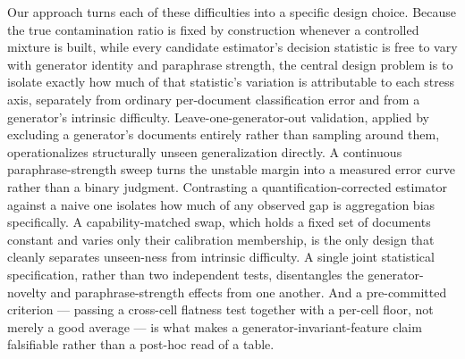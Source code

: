\documentclass[11pt]{article}
\begin{document}
Our approach turns each of these difficulties into a specific design choice. Because the true contamination ratio is fixed by construction whenever a controlled mixture is built, while every candidate estimator's decision statistic is free to vary with generator identity and paraphrase strength, the central design problem is to isolate exactly how much of that statistic's variation is attributable to each stress axis, separately from ordinary per-document classification error and from a generator's intrinsic difficulty. Leave-one-generator-out validation, applied by excluding a generator's documents entirely rather than sampling around them, operationalizes structurally unseen generalization directly. A continuous paraphrase-strength sweep turns the unstable margin into a measured error curve rather than a binary judgment. Contrasting a quantification-corrected estimator against a naive one isolates how much of any observed gap is aggregation bias specifically. A capability-matched swap, which holds a fixed set of documents constant and varies only their calibration membership, is the only design that cleanly separates unseen-ness from intrinsic difficulty. A single joint statistical specification, rather than two independent tests, disentangles the generator-novelty and paraphrase-strength effects from one another. And a pre-committed criterion --- passing a cross-cell flatness test together with a per-cell floor, not merely a good average --- is what makes a generator-invariant-feature claim falsifiable rather than a post-hoc read of a table.
\end{document}
